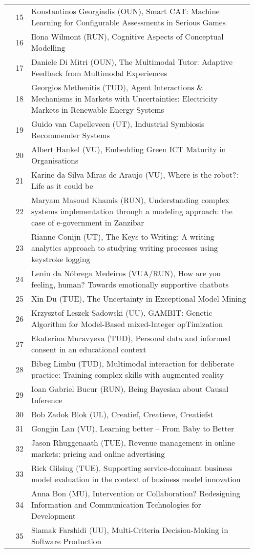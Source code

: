 {\begin{xltabular}{\linewidth}{@{} l @{\hspace{0.5em}} l @{\hspace{1em}} X @{}}
        &	 15	&	 Konstantinos Georgiadis (OUN),  Smart CAT: Machine Learning for Configurable Assessments in Serious Games \\
        &	 16	&	 Ilona Wilmont (RUN), Cognitive Aspects of Conceptual Modelling \\
        &	 17	&	 Daniele Di Mitri (OUN), The Multimodal Tutor: Adaptive Feedback from Multimodal Experiences \\
        &	 18	&	 Georgios Methenitis (TUD), Agent Interactions \& Mechanisms in Markets with Uncertainties: Electricity Markets in Renewable Energy Systems \\
        &	 19	&	 Guido van Capelleveen (UT), Industrial Symbiosis Recommender Systems \\
        &	 20	&	 Albert Hankel (VU), Embedding Green ICT Maturity in Organisations \\
        &	 21	&	 Karine da Silva Miras de Araujo (VU), Where is the robot?: Life as it could be \\
        &	 22	&	 Maryam Masoud Khamis (RUN), Understanding complex systems implementation through a modeling approach: the case of e-government in Zanzibar \\
        &	 23	&	 Rianne Conijn (UT), The Keys to Writing: A writing analytics approach to studying writing processes using keystroke logging \\
        &	 24	&	 Lenin da N\'{o}brega Medeiros (VUA/RUN), How are you feeling, human? Towards emotionally supportive chatbots \\
        &	 25	&	 Xin Du (TUE), The Uncertainty in Exceptional Model Mining \\
        &	 26	&	 Krzysztof Leszek Sadowski (UU), GAMBIT: Genetic Algorithm for Model-Based mixed-Integer opTimization \\
        &	 27	&	 Ekaterina Muravyeva (TUD), Personal data and informed consent in an educational context \\
        &	 28	&	 Bibeg Limbu (TUD), Multimodal interaction for deliberate practice: Training complex skills with augmented reality \\
        &	 29	&	 Ioan Gabriel Bucur (RUN), Being Bayesian about Causal Inference \\
        &	 30	&	 Bob Zadok Blok (UL), Creatief, Creatieve, Creatiefst \\
        &	 31	&	 Gongjin Lan (VU), Learning better -- From Baby to Better \\
        &	 32	& 	 Jason Rhuggenaath (TUE), Revenue management in online markets: pricing and online advertising \\
        &	 33	& 	 Rick Gilsing (TUE), Supporting service-dominant business model evaluation in the context of business model innovation \\
        &	 34	&	 Anna Bon (MU), Intervention or Collaboration? Redesigning Information and Communication Technologies for Development \\
        &	 35	&	 Siamak Farshidi (UU), Multi-Criteria Decision-Making in Software Production \\


\end{xltabular}}
